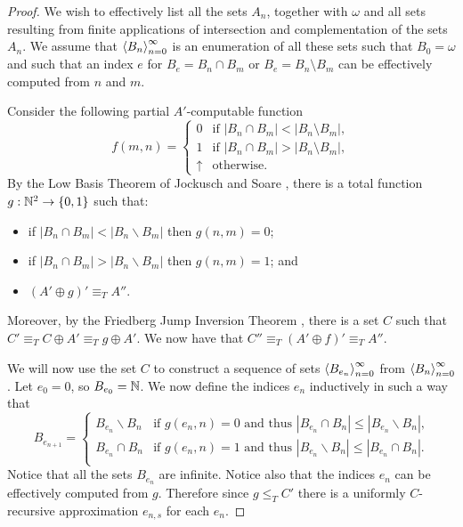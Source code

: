 \begin{proof}
We wish to effectively list all the sets $A_n$, together with $\omega$
and all sets resulting from finite applications of intersection and
complementation of the sets $A_n$.  We assume that
$\left\langle B_n\right\rangle_{n=0}^\infty$ is an enumeration of all these sets such that
$B_0 = \omega$ and such that an index $e$ for $B_e = B_n \cap B_m$ or
$B_e = B_n \setminus B_m$ can be effectively computed from $n$ and $m$.

Consider the following partial $A'$-computable function
  \begin{equation*}
    f(m,n) =
    \begin{cases}
      0 & \text{if } |B_n\cap B_m|<|B_n\setminus B_m|,\\
      1 & \text{if } |B_n\cap B_m|>|B_n\setminus B_m|,\\
      {\uparrow} & \text{otherwise.}
    \end{cases}
  \end{equation*}
By the Low Basis Theorem of Jockusch and Soare \cite{lowbasis},
there is a total function $g:\mathbb{N}^2\to\{0,1\}$ such that:
\begin{itemize}
  \item if $|B_n\cap B_m|<|B_n\backslash B_m|$ then $g(n,m)=0$;
  \item if $|B_n\cap B_m|>|B_n\backslash B_m|$ then $g(n,m)=1$; and
  \item $(A'\oplus g)' \equiv_T A''$.
\end{itemize}
Moreover, by the Friedberg Jump Inversion Theorem \cite{jumpinversion},
there is a set $C$ such that $C' \equiv_T C \oplus A' \equiv_T g \oplus A'$.
We now have that $C'' \equiv_T (A'\oplus f)' \equiv_T A''$.

We will now use the set $C$ to construct a sequence of sets
$\left\langle B_{e_n}\right\rangle_{n=0}^\infty$ from $\left\langle B_n\right\rangle_{n=0}^\infty$.
Let $e_0=0$, so $B_{e_0}=\mathbb{N}$.
We now define the indices $e_n$ inductively in such a way that
\begin{equation*}
  B_{e_{n+1}}=
  \begin{cases}
    B_{e_n}\backslash B_n & \text{if $g(e_n,n)=0$ and thus $|B_{e_n}\cap B_n|\leq|B_{e_n}\backslash B_n|$,} \\
    B_{e_n}\cap B_n & \text{if $g(e_n,n)=1$ and thus $|B_{e_n}\backslash B_n|\leq|B_{e_n}\cap B_n|$.} \\
  \end{cases}
\end{equation*}
Notice that all the sets $B_{e_n}$ are infinite.
Notice also that the indices $e_n$ can be effectively computed from $g$.
Therefore since $g \leq_T C'$ there is a uniformly $C$-recursive
approximation $e_{n,s}$ for each $e_n$.


\end{proof}
